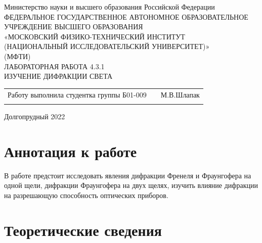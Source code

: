 \documentclass[a4paper]{article}
\begin{document}
 
 \begin{titlepage}
\begin{center}
\hfill \break
Министерство науки и высшего образования Российской Федерации\\
ФЕДЕРАЛЬНОЕ ГОСУДАРСТВЕННОЕ АВТОНОМНОЕ ОБРАЗОВАТЕЛЬНОЕ\\ 
УЧРЕЖДЕНИЕ ВЫСШЕГО ОБРАЗОВАНИЯ\\ 
«МОСКОВСКИЙ ФИЗИКО-ТЕХНИЧЕСКИЙ ИНСТИТУТ\\ 
(НАЦИОНАЛЬНЫЙ ИССЛЕДОВАТЕЛЬСКИЙ УНИВЕРСИТЕТ)»\\
(МФТИ)\\
\hfill \break
\hfill \break
\hfill \break
\hfill \break
\hfill \break
\hfill \break
\hfill \break
\hfill \break
\hfill \break
\hfill \break
\hfill \break
ЛАБОРАТОРНАЯ РАБОТА 4.3.1\\
\hfill \break
ИЗУЧЕНИЕ ДИФРАКЦИИ СВЕТА\\
\end{center}
\hfill \break
\hfill \break
\hfill \break
\hfill \break
\hfill \break
\hfill \break
\hfill \break
\hfill \break
\hfill \break
\hfill \break
\begin{tabular}{ccc}
Работу выполнила студентка группы Б01-009 & & М.В.Шлапак \\\\
\end{tabular}
\hfill \break
\hfill \break
\hfill \break
\hfill \break
\hfill \break
\hfill \break
\hfill \break
\hfill \break
\begin{center} Долгопрудный 2022 \end{center}
\end{titlepage}
\small
{}
\tableofcontents    
\newpage
\section{Аннотация к работе}

В работе предстоит исследовать явления дифракции Френеля и Фраунгофера на одной щели, дифракции Фраунгофера на двух щелях, изучить влияние дифракции на разрешающую способность оптических приборов.

\section{Теоретические сведения}
\end{document}
